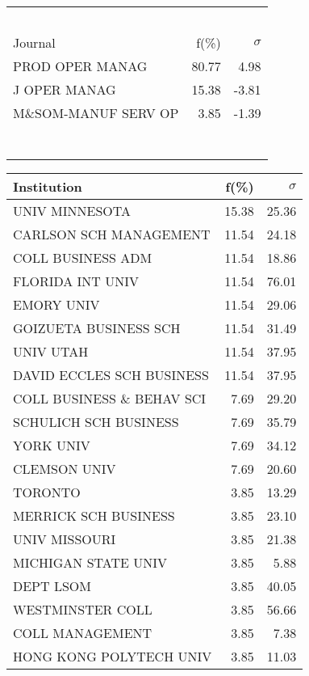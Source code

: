 \documentclass[a4paper,11pt]{report}
\begin{document}
\begin{landscape}
\begin{table}[!ht]
{\begin{tabular}{|l r  r|}
 &  & \\
 &  & \\
 &  & \\
 &  & \\
 &  & \\
\hline
\hline
Journal & f(\%) & $\sigma$\\
\hline
PROD OPER MANAG & 80.77 & 4.98\\
J OPER MANAG & 15.38 & -3.81\\
M\&SOM-MANUF SERV OP & 3.85 & -1.39\\
 &  & \\
 &  & \\
 &  & \\
 &  & \\
 &  & \\
 &  & \\
 &  & \\
\hline
\end{tabular}
}
{\scriptsize\begin{tabular}{|l r r|}
\hline
Institution & f(\%) & $\sigma$\\
\hline
UNIV MINNESOTA & 15.38 & 25.36\\
CARLSON SCH MANAGEMENT & 11.54 & 24.18\\
COLL BUSINESS ADM & 11.54 & 18.86\\
FLORIDA INT UNIV & 11.54 & 76.01\\
EMORY UNIV & 11.54 & 29.06\\
GOIZUETA BUSINESS SCH & 11.54 & 31.49\\
UNIV UTAH & 11.54 & 37.95\\
DAVID ECCLES SCH BUSINESS & 11.54 & 37.95\\
COLL BUSINESS \& BEHAV SCI & 7.69 & 29.20\\
SCHULICH SCH BUSINESS & 7.69 & 35.79\\
YORK UNIV & 7.69 & 34.12\\
CLEMSON UNIV & 7.69 & 20.60\\
TORONTO & 3.85 & 13.29\\
MERRICK SCH BUSINESS & 3.85 & 23.10\\
UNIV MISSOURI & 3.85 & 21.38\\
MICHIGAN STATE UNIV & 3.85 & 5.88\\
DEPT LSOM & 3.85 & 40.05\\
WESTMINSTER COLL & 3.85 & 56.66\\
COLL MANAGEMENT & 3.85 & 7.38\\
HONG KONG POLYTECH UNIV & 3.85 & 11.03\\

\end{tabular}}
\end{table}
\end{landscape}
\end{document}
